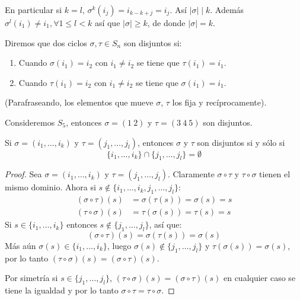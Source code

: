 En particular si $k=l$, $\sigma^k(i_j) = i_{k-k+j} = i_j$.
Así $|\sigma| \mid k$. Además $\sigma^l(i_1) \neq i_1, \forall 1 \leq l < k$ así que $|\sigma| \geq k$, de donde $|\sigma| = k$.

\begin{defi}
    Diremos que dos ciclos $\sigma, \tau \in S_n$ son disjuntos si:
    \begin{enumerate}
        \item[i)] Cuando $\sigma(i_1) = i_2$ con $i_1 \neq i_2$ se tiene que $\tau(i_1) = i_1$.
        \item[ii)] Cuando $\tau(i_1) = i_2$ con $i_1 \neq i_2$ se tiene que $\sigma(i_1) = i_1$.
    \end{enumerate}
    (Parafraseando, los elementos que mueve $\sigma$, $\tau$ los fija y recíprocamente).
\end{defi}

\begin{eje}
    Consideremos $S_5$, entonces $\sigma = (1 \ 2)$ y $\tau = (3 \ 4 \ 5)$ son disjuntos.
\end{eje}

\begin{nota}
    Si $\sigma = (i_1, \dots, i_k)$ y $\tau = (j_1, \dots, j_l)$, entonces $\sigma$ y $\tau$ son disjuntos si y sólo si
    \begin{equation*}
        \{i_1, \dots, i_k\} \cap \{j_1, \dots, j_l\} = \emptyset
    \end{equation*}
\end{nota}


\begin{proof}
    Sea $\sigma = (i_1, \dots, i_k)$ y $\tau = (j_1, \dots, j_l)$. Claramente $\sigma \circ \tau$ y $\tau \circ \sigma$ tienen el mismo dominio. Ahora si $s \notin \{i_1, \dots, i_k, j_1, \dots, j_l\}$:
    \begin{equation*}
    \begin{aligned}
        (\sigma \circ \tau)(s) &= \sigma(\tau(s)) = \sigma(s) = s \\
        (\tau \circ \sigma)(s) &= \tau(\sigma(s)) = \tau(s) = s
    \end{aligned}
    \end{equation*}
    Si $s \in \{i_1, \dots, i_k\}$ entonces $s \notin \{j_1, \dots, j_l\}$, así que:
    \begin{equation*}
        (\sigma \circ \tau)(s) = \sigma(\tau(s)) = \sigma(s)
    \end{equation*}
    Más aún $\sigma(s) \in \{i_1, \dots, i_k\}$, luego $\sigma(s) \notin \{j_1, \dots, j_l\}$ y $\tau(\sigma(s)) = \sigma(s)$, por lo tanto $(\tau \circ \sigma)(s) = (\sigma \circ \tau)(s)$.
    
    Por simetría si $s \in \{j_1, \dots, j_l\}$, $(\tau \circ \sigma)(s) = (\sigma \circ \tau)(s)$ en cualquier caso se tiene la igualdad y por lo tanto $\sigma \circ \tau = \tau \circ \sigma$.
\end{proof}

